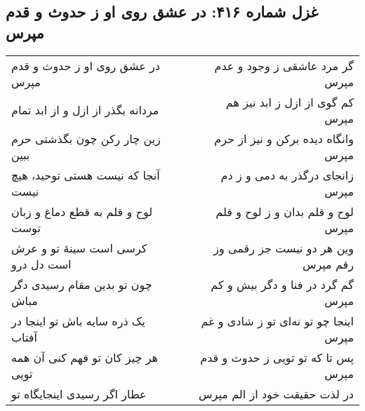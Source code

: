\begin{center}
\section*{غزل شماره ۴۱۶: در عشق روی او ز حدوث و قدم مپرس}
\label{sec:416}
\begin{longtable}{l p{0.5cm} r}
در عشق روی او ز حدوث و قدم مپرس
&&
گر مرد عاشقی ز وجود و عدم مپرس
\\
مردانه بگذر از ازل و از ابد تمام
&&
کم گوی از ازل ز ابد نیز هم مپرس
\\
زین چار رکن چون بگذشتی حرم ببین
&&
وانگاه دیده برکن و نیز از حرم مپرس
\\
آنجا که نیست هستی توحید، هیچ نیست
&&
زانجای درگذر به دمی و ز دم مپرس
\\
لوح و قلم به قطع دماغ و زبان توست
&&
لوح و قلم بدان و ز لوح و قلم مپرس
\\
کرسی است سینهٔ تو و عرش است دل درو
&&
وین هر دو نیست جز رقمی وز رقم مپرس
\\
چون تو بدین مقام رسیدی دگر مباش
&&
گم گرد در فنا و دگر بیش و کم مپرس
\\
یک ذره سایه باش تو اینجا در آفتاب
&&
اینجا چو تو نه‌ای تو ز شادی و غم مپرس
\\
هر چیز کان تو فهم کنی آن همه تویی
&&
پس تا که تو تویی ز حدوث و قدم مپرس
\\
عطار اگر رسیدی اینجایگاه تو
&&
در لذت حقیقت خود از الم مپرس
\\
\end{longtable}
\end{center}
